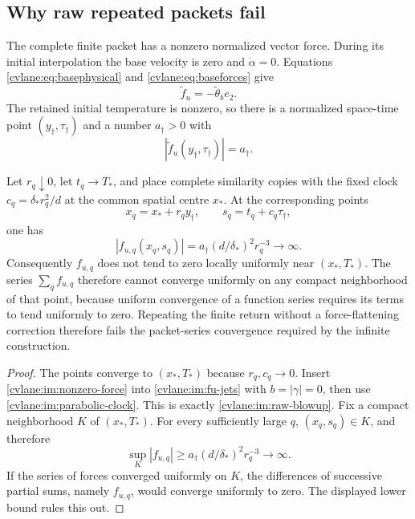 \subsection{Why raw repeated packets fail}

The complete finite packet has a nonzero normalized vector force.  During
its initial interpolation the base velocity is zero and
$\dot\alpha=0$.  Equations \eqref{cvlane:eq:basephysical} and
\eqref{cvlane:eq:baseforces} give
\[
 \widetilde f_u=-\widetilde\theta_b e_2.
\]
The retained initial temperature is nonzero, so there is a normalized
space-time point $(y_\dagger,\tau_\dagger)$ and a number $a_\dagger>0$
with
\begin{equation}\label{cvlane:im:nonzero-force}
 |\widetilde f_u(y_\dagger,\tau_\dagger)|=a_\dagger.
\end{equation}

\begin{cvlaneproposition}\label{cvlane:im:raw-obstruction}
Let $r_q\downarrow0$, let $t_q\to T_*$, and place complete similarity
copies with the fixed clock
$c_q=\delta_*r_q^2/d$ at the common spatial centre $x_*$.  At the
corresponding points
\[
 x_q=x_*+r_qy_\dagger,\qquad
 s_q=t_q+c_q\tau_\dagger,
\]
one has
\begin{equation}\label{cvlane:im:raw-blowup}
 |f_{u,q}(x_q,s_q)|
 =a_\dagger(d/\delta_*)^2r_q^{-3}\longrightarrow\infty.
\end{equation}
Consequently $f_{u,q}$ does not tend to zero locally uniformly near
$(x_*,T_*)$.  The series $\sum_qf_{u,q}$ therefore cannot converge
uniformly on any compact neighborhood of that point, because uniform
convergence of a function series requires its terms to tend uniformly
to zero.  Repeating the finite return without a force-flattening
correction therefore fails the packet-series convergence required by
the infinite construction.
\end{cvlaneproposition}

\begin{proof}
The points converge to $(x_*,T_*)$ because $r_q,c_q\to0$.
Insert \eqref{cvlane:im:nonzero-force} into \eqref{cvlane:im:fu-jets} with
$b=|\gamma|=0$, then use \eqref{cvlane:im:parabolic-clock}.  This is exactly
\eqref{cvlane:im:raw-blowup}.  Fix a compact neighborhood $K$ of
$(x_*,T_*)$.  For every sufficiently large $q$, $(x_q,s_q)\in K$, and
therefore
\[
 \sup_K|f_{u,q}|\geq
 a_\dagger(d/\delta_*)^2r_q^{-3}\longrightarrow\infty.
\]
If the series of forces converged uniformly on $K$, the differences of
successive partial sums, namely $f_{u,q}$, would converge uniformly to
zero.  The displayed lower bound rules this out.
\end{proof}

